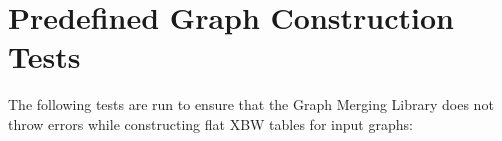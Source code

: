 \documentclass[a4paper,12pt,twoside,BCOR=10mm]{scrbook}
\begin{document}
\section{Predefined Graph Construction Tests}
\label{sec:appendix_graph_const_tests}
%


The following tests are run to ensure that the Graph Merging Library does not throw errors 
while constructing flat XBW tables for input graphs:
\end{document}
